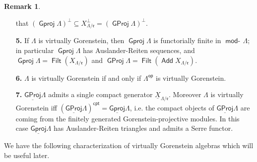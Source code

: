 \documentclass[oneside, a4paper,reqno]{amsart}
\numberwithin{equation}{section}
\theoremstyle{definition}
\newtheorem{rem}[thm]{Remark}
\begin{document}
\begin{rem}
\begin{enumerate}
that $({\operatorname{\mathsf{Gproj}}\nolimits}\Lambda)^{\pmb{\bot}} \subseteq
X^{\pmb{\bot}}_{\Lambda/\mathfrak{r}} = ({\operatorname{\mathsf{GProj}}\nolimits}\Lambda)^{\bot}$.
\item[{\bf 5.}] If $\Lambda$ is virtually Gorenstein, then
${\operatorname{\mathsf{Gproj}}\nolimits}\Lambda$ is functorially finite in $\operatorname*{\mathsf{mod}-\!}\Lambda$; in
particular ${\operatorname{\mathsf{Gproj}}\nolimits}\Lambda$ has Auslander-Reiten sequences, and
${\operatorname{\mathsf{Gproj}}\nolimits}\Lambda = \operatorname*{\mathsf{Filt}}(X_{\Lambda/\mathfrak{r}})$ and ${\operatorname{\mathsf{GProj}}\nolimits}\Lambda
= \operatorname*{\mathsf{Filt}}(\operatorname*{\mathsf{Add}} X_{\Lambda/\mathfrak{r}})$.
\item[{\bf 6.}] $\Lambda$ is virtually
Gorenstein if and only if $\Lambda^\operatorname*{\mathsf{op}}$ is virtually Gorenstein.
\item[{\bf 7.}] ${\operatorname{\underline{\mathsf{GProj}}}\nolimits}\Lambda$ admits a single compact generator ${\underline X}_{\Lambda/\mathfrak{r}}$.
Moreover
$\Lambda$ is virtually Gorenstein iff $({\operatorname{\underline{\mathsf{GProj}}}\nolimits}\Lambda)^{\mathsf{cpt}} =
{\operatorname{\underline{\mathsf{Gproj}}}\nolimits}\Lambda$, i.e.  the compact objects of ${\operatorname{\underline{\mathsf{GProj}}}\nolimits}\Lambda$ are
coming from the finitely generated Gorenstein-projective modules. In
this case ${\operatorname{\underline{\mathsf{Gproj}}}\nolimits}\Lambda$ has Auslander-Reiten triangles and admits
a Serre functor.
\end{enumerate}
\end{rem}

We have the following characterization of virtually Gorenstein
algebras which will be useful later.
\end{document}
